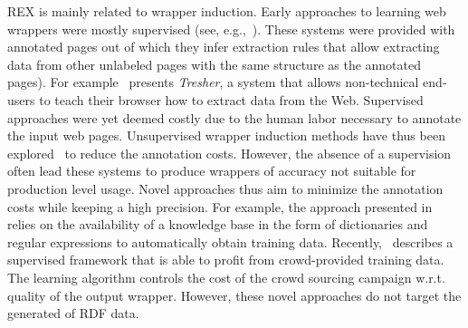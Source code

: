 REX is mainly related to wrapper induction. 
Early approaches to learning web wrappers were mostly supervised (see, e.g.,~\cite{Hogue:2005:TAU:1060745.1060762,flesca2004web}). 
These systems were provided with annotated pages out of which they infer extraction rules that allow extracting data from other unlabeled pages with the same structure as the annotated pages). 
For example~\cite{Hogue:2005:TAU:1060745.1060762} presents \emph{Tresher}, a system that allows non-technical end-users to teach their browser how to extract data from the Web. 
Supervised approaches were yet deemed costly due to the human labor necessary to annotate the input web pages. 
Unsupervised wrapper induction methods have thus been explored~\cite{DBLP:journals/aai/CrescenziM08,exalg} to reduce the annotation costs. 
However, the absence of a supervision often lead these systems to produce wrappers of accuracy not suitable for production level usage.
Novel approaches thus aim to minimize the annotation costs while keeping a high precision.
For example, the approach presented in~\cite{Dalvi:2011:AWL:1938545.1938547} relies on the availability of a knowledge base in the form of dictionaries and regular expressions to automatically obtain training data. 
Recently, \cite{Crescenzi2013}~describes a supervised framework that is able to profit from crowd-provided training data. 
The learning algorithm controls the cost of the crowd sourcing campaign w.r.t. quality of the output wrapper.
However, these novel approaches do not target the generated of RDF data.


